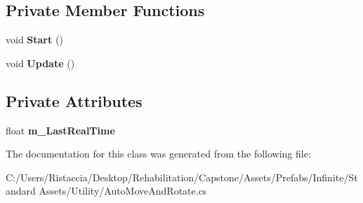 \subsection*{Private Member Functions}
\begin{DoxyCompactItemize}
\item 
\mbox{\label{class_unity_standard_assets_1_1_utility_1_1_auto_move_and_rotate_ae9dbefc1930f3f071a52e64dabff8189}} 
void {\bfseries Start} ()
\item 
\mbox{\label{class_unity_standard_assets_1_1_utility_1_1_auto_move_and_rotate_a291401d868f8dc0cb1c89b2318b69822}} 
void {\bfseries Update} ()
\end{DoxyCompactItemize}
\subsection*{Private Attributes}
\begin{DoxyCompactItemize}
\item 
\mbox{\label{class_unity_standard_assets_1_1_utility_1_1_auto_move_and_rotate_a6cbd6fae7fee37df42072e3b8e1ebb9c}} 
float {\bfseries m\+\_\+\+Last\+Real\+Time}
\end{DoxyCompactItemize}


The documentation for this class was generated from the following file\+:\begin{DoxyCompactItemize}
\item 
C\+:/\+Users/\+Ristaccia/\+Desktop/\+Rehabilitation/\+Capstone/\+Assets/\+Prefabs/\+Infinite/\+Standard Assets/\+Utility/Auto\+Move\+And\+Rotate.\+cs\end{DoxyCompactItemize}
